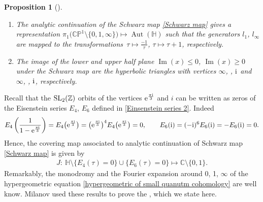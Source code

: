 \documentclass[pdftex]{sigma}
\numberwithin{equation}{section}
\newtheorem{Proposition}[Theorem]{Proposition}
 { \theoremstyle{definition}
\newtheorem{Definition}[Theorem]{Definition}
\newtheorem{Remark}[Theorem]{Remark} }
\begin{document}
\begin{Proposition}[{\cite{Milanov}}]\label{Milanov lemma small 1}\quad
\begin{enumerate}\itemsep=0pt
\item[$(1)$]
The analytic continuation of the Schwarz map \eqref{Schwarz map} gives a representation
$\pi_1\bigl(\mathbb{CP}^1\setminus\{0,1,\infty\}\bigr)\mapsto \operatorname{Aut}(\mathbb{H})$
such that the generators $l_1$, $l_{\infty}$ are mapped to the transformations~${
\tau\mapsto \frac{-1}{\tau}}$, $ \tau\mapsto \tau+1$,
respectively.
\item[$(2)$] The image of the lower and upper half plane $\operatorname{Im}(x)\leq 0$, $\operatorname{Im}(x)\geq 0$ under the Schwarz map are the hyperbolic triangles with vertices $\infty$, , ${\rm i}$ and $\infty$, , ${\rm i}$, respectively.
\end{enumerate}
\end{Proposition}

Recall that the ${\rm SL}_2(\mathbb{Z})$ orbits of the vertices ${\rm e}^{\frac{\pi {\rm i}}{3}}$ and $i$ can be written as zeros of the Eisenstein series $E_4$, $E_6$ defined in \eqref{Einsenstein series 2}. Indeed
\begin{gather*}
E_4\left(\frac{1}{1-{\rm e}^{\frac{\pi {\rm i}}{3}} }\right)=E_4\bigl({\rm e}^{\frac{\pi {\rm i}}{3}}\bigr)=\bigl({\rm e}^{\frac{\pi {\rm i}}{3}}\bigr)^4E_4\bigl({\rm e}^{\frac{\pi {\rm i}}{3}}\bigr)=0,\qquad
E_6({\rm i})=(-{\rm i})^6E_6({\rm i})=-E_6({\rm i})=0.
\end{gather*}
Hence, the covering map associated to analytic continuation of Schwarz map \eqref{Schwarz map} is given by
\begin{gather}\label{function J covering definition}
J\colon\ \mathbb{H}\setminus\{E_4(\tau)=0\}\cup\{E_6(\tau)=0\}\mapsto \mathbb{C}\setminus\{0,1\}.
\end{gather}
Remarkably, the monodromy and the Fourier expansion around 0, 1, $\infty$ of the hypergeometric equation \eqref{hypergeometric of small quanutm cohomology} are well know. Milanov used these results to prove the \cite[Lemma 4.3]{Milanov}, which we state here.
\end{document}
